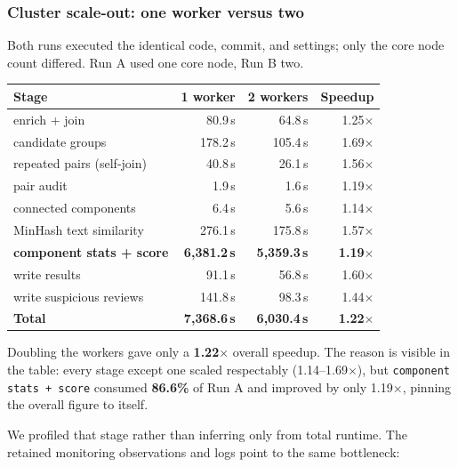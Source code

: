 \documentclass[12pt]{article}
\begin{document}
\subsubsection{Cluster scale-out: one worker versus two}
\label{sec:scaleout}

Both runs executed the identical code, commit, and settings; only the core
node count differed. Run A used one core node, Run B two.

\begin{center}
\begin{tabular}{@{}lrrr@{}}
  \toprule
  \textbf{Stage} & \textbf{1 worker} & \textbf{2 workers} & \textbf{Speedup} \\
  \midrule
  enrich + join                 & 80.9\,s   & 64.8\,s   & 1.25$\times$ \\
  candidate groups              & 178.2\,s  & 105.4\,s  & 1.69$\times$ \\
  repeated pairs (self-join)    & 40.8\,s   & 26.1\,s   & 1.56$\times$ \\
  pair audit                    & 1.9\,s    & 1.6\,s    & 1.19$\times$ \\
  connected components          & 6.4\,s    & 5.6\,s    & 1.14$\times$ \\
  MinHash text similarity       & 276.1\,s  & 175.8\,s  & 1.57$\times$ \\
  \textbf{component stats + score} & \textbf{6{,}381.2\,s} & \textbf{5{,}359.3\,s} & \textbf{1.19$\times$} \\
  write results                 & 91.1\,s   & 56.8\,s   & 1.60$\times$ \\
  write suspicious reviews      & 141.8\,s  & 98.3\,s   & 1.44$\times$ \\
  \midrule
  \textbf{Total}                & \textbf{7{,}368.6\,s} & \textbf{6{,}030.4\,s} & \textbf{1.22$\times$} \\
  \bottomrule
\end{tabular}
\end{center}

Doubling the workers gave only a \textbf{1.22$\times$} overall speedup. The
reason is visible in the table: every stage except one scaled respectably
(1.14--1.69$\times$), but \texttt{component stats + score} consumed
\textbf{86.6\%} of Run A and improved by only 1.19$\times$, pinning the
overall figure to itself.

We profiled that stage rather than inferring only from total runtime. The
retained monitoring observations and logs point to the same bottleneck:
\end{document}
